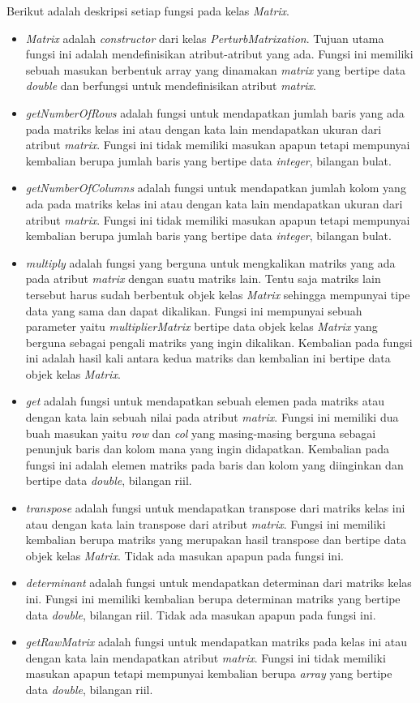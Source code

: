 Berikut adalah deskripsi setiap fungsi pada kelas \textit{Matrix}.
\begin{itemize}
	\item \textit{Matrix} adalah \textit{constructor} dari kelas \textit{PerturbMatrixation}. Tujuan utama fungsi ini adalah mendefinisikan atribut-atribut yang ada. Fungsi ini memiliki sebuah masukan berbentuk array yang dinamakan \textit{matrix} yang bertipe data \textit{double} dan berfungsi untuk mendefinisikan atribut \textit{matrix}.
	\item \textit{getNumberOfRows} adalah fungsi untuk mendapatkan jumlah baris yang ada pada matriks kelas ini atau dengan kata lain mendapatkan ukuran dari atribut \textit{matrix}. Fungsi ini tidak memiliki masukan apapun tetapi mempunyai kembalian berupa jumlah baris yang bertipe data \textit{integer}, bilangan bulat.
	\item \textit{getNumberOfColumns} adalah fungsi untuk mendapatkan jumlah kolom yang ada pada matriks kelas ini atau dengan kata lain mendapatkan ukuran dari atribut \textit{matrix}. Fungsi ini tidak memiliki masukan apapun tetapi mempunyai kembalian berupa jumlah baris yang bertipe data \textit{integer}, bilangan bulat.
	\item \textit{multiply} adalah fungsi yang berguna untuk mengkalikan matriks yang ada pada atribut \textit{matrix} dengan suatu matriks lain. Tentu saja matriks lain tersebut harus sudah berbentuk objek kelas \textit{Matrix} sehingga mempunyai tipe data yang sama dan dapat dikalikan. Fungsi ini mempunyai sebuah parameter yaitu \textit{multiplierMatrix} bertipe data objek kelas \textit{Matrix} yang berguna sebagai pengali matriks yang ingin dikalikan. Kembalian pada fungsi ini adalah hasil kali antara kedua matriks dan kembalian ini bertipe data objek kelas \textit{Matrix}.
	\item \textit{get} adalah fungsi untuk mendapatkan sebuah elemen pada matriks atau dengan kata lain sebuah nilai pada atribut \textit{matrix}. Fungsi ini memiliki dua buah masukan yaitu \textit{row} dan \textit{col} yang masing-masing berguna sebagai penunjuk baris dan kolom mana yang ingin didapatkan. Kembalian pada fungsi ini adalah elemen matriks pada baris dan kolom yang diinginkan dan bertipe data \textit{double}, bilangan riil.
	\item \textit{transpose} adalah fungsi untuk mendapatkan transpose dari matriks kelas ini atau dengan kata lain transpose dari atribut \textit{matrix}. Fungsi ini memiliki kembalian berupa matriks yang merupakan hasil transpose dan bertipe data objek kelas \textit{Matrix}. Tidak ada masukan apapun pada fungsi ini.
	\item \textit{determinant} adalah fungsi untuk mendapatkan determinan dari matriks kelas ini. Fungsi ini memiliki kembalian berupa determinan matriks yang bertipe data \textit{double}, bilangan riil. Tidak ada masukan apapun pada fungsi ini.
	\item \textit{getRawMatrix} adalah fungsi untuk mendapatkan matriks pada kelas ini atau dengan kata lain mendapatkan atribut \textit{matrix}. Fungsi ini tidak memiliki masukan apapun tetapi mempunyai kembalian berupa \textit{array} yang bertipe data \textit{double}, bilangan riil.
\end{itemize}

